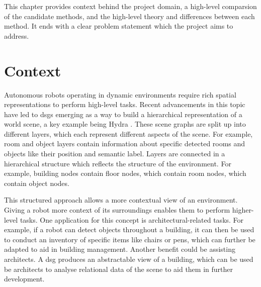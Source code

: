 %

This chapter provides context behind the project domain, a high-level comparsion of the candidate methods, and the high-level theory and differences between each method. It ends with a clear problem statement which the project aims to address.


\section{Context}\label{sec:context}
Autonomous robots operating in dynamic environments require rich spatial representations to perform high-level tasks. Recent advancements in this topic have led to \gls{dsg}s emerging as a way to build a hierarchical representation of a world scene, a key example being Hydra \cite{hydra}. These scene graphs are split up into different layers, which each represent different aspects of the scene. For example, room and object layers contain information about specific detected rooms and objects like their position and semantic label. Layers are connected in a hierarchical structure which reflects the structure of the environment. For example, building nodes contain floor nodes, which contain room nodes, which contain object nodes. 

This structured approach allows a more contextual view of an environment. Giving a robot more context of its surroundings enables them to perform higher-level tasks. One application for this concept is architectural-related tasks. For example, if a robot can detect objects throughout a building, it can then be used to conduct an inventory of specific items like chairs or pens, which can further be adapted to aid in building management. Another benefit could be assisting architects. A \gls{dsg} produces an abstractable view of a building, which can be used be architects to analyse relational data of the scene to aid them in further development.

